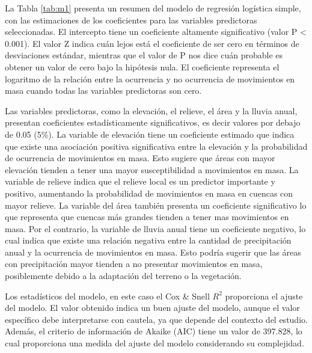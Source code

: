 \documentclass[
  manuscript=article,  
  layout=preprint,  
]{format}
\begin{document}
La Tabla \ref{tab:m1} presenta un resumen del modelo de regresión logística simple, con las estimaciones de los coeficientes para las variables predictoras seleccionadas. El intercepto tiene un coeficiente altamente significativo (valor P < 0.001). El valor Z indica cuán lejos está el coeficiente de ser cero en términos de desviaciones estándar, mientras que el valor de P nos dice cuán probable es obtener un valor de cero bajo la hipótesis nula. El coeficiente representa el logaritmo de la relación entre la ocurrencia y no ocurrencia de movimientos en masa cuando todas las variables predictoras son cero. 

Las variables predictoras, como la elevación, el relieve, el área y la lluvia anual, presentan coeficientes estadísticamente significativos, es decir valores por debajo de 0.05 (5\%). La variable de elevación tiene un coeficiente estimado que indica que existe una asociación positiva significativa entre la elevación y la probabilidad de ocurrencia de movimientos en masa. Esto sugiere que áreas con mayor elevación tienden a tener una mayor susceptibilidad a movimientos en masa. La variable de relieve indica que el relieve local es un predictor importante y positivo, aumentando la probabilidad de movimientos en masa en cuencas con mayor relieve. La variable del área también presenta un coeficiente significativo lo que representa que cuencas más grandes tienden a tener mas movimientos en masa. Por el contrario, la variable de lluvia anual tiene un coeficiente negativo, lo cual indica que existe una relación negativa entre la cantidad de precipitación anual y la ocurrencia de movimientos en masa. Esto podría sugerir que las áreas con precipitación mayor tienden a no presentar movimientos en masa, posiblemente debido a la adaptación del terreno o la vegetación.

Los estadísticos del modelo, en este caso el Cox \& Snell $R^2$ proporciona el ajuste del modelo. El valor obtenido indica un buen ajuste del modelo, aunque el valor específico debe interpretarse con cautela, ya que depende del contexto del estudio. Además, el criterio de información de Akaike (AIC) tiene un valor de 397.828, lo cual proporciona una medida del ajuste del modelo considerando su complejidad.
\end{document}
